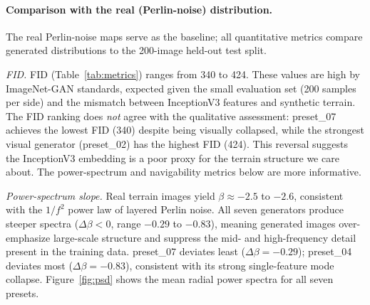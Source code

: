 \documentclass[11pt]{article}
\begin{document}
\paragraph{Comparison with the real (Perlin-noise) distribution.}
The real Perlin-noise maps serve as the baseline; all quantitative metrics
compare generated distributions to the 200-image held-out test split.

\textit{FID.} FID (Table~\ref{tab:metrics}) ranges from 340 to 424.
These values are high by ImageNet-GAN standards, expected given the small
evaluation set (200 samples per side) and the mismatch between InceptionV3
features and synthetic terrain. The FID ranking does \emph{not} agree with
the qualitative assessment: preset\_07 achieves the lowest FID (340) despite
being visually collapsed, while the strongest visual generator (preset\_02)
has the highest FID (424). This reversal suggests the InceptionV3 embedding
is a poor proxy for the terrain structure we care about. The power-spectrum
and navigability metrics below are more informative.

\textit{Power-spectrum slope.} Real terrain images yield
$\beta \approx -2.5$ to $-2.6$, consistent with the $1/f^2$ power law of
layered Perlin noise. All seven generators produce steeper spectra
($\Delta\beta < 0$, range $-0.29$ to $-0.83$), meaning generated images
over-emphasize large-scale structure and suppress the mid- and
high-frequency detail present in the training data. preset\_07 deviates least
($\Delta\beta = -0.29$); preset\_04 deviates most ($\Delta\beta = -0.83$),
consistent with its strong single-feature mode collapse.
Figure~\ref{fig:psd} shows the mean radial power spectra for all seven presets.
\end{document}
